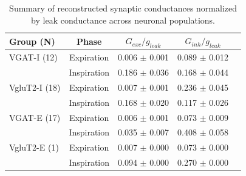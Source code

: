 \begin{table}[htbp]
\centering
\caption{Summary of reconstructed synaptic conductances normalized by leak conductance across neuronal populations.}
\label{tab:conductance_summary}
\begin{tabular}{lcccc}
\hline
Group (N) & Phase & $G_{exc}/g_{leak}$ & $G_{inh}/g_{leak}$ \\
\hline
VGAT-I (12) & Expiration & 0.006 $\pm$ 0.001 & 0.089 $\pm$ 0.012 \\
& Inspiration & 0.186 $\pm$ 0.036 & 0.168 $\pm$ 0.044 \\
\hline
VgluT2-I (18) & Expiration & 0.007 $\pm$ 0.001 & 0.236 $\pm$ 0.045 \\
& Inspiration & 0.168 $\pm$ 0.020 & 0.117 $\pm$ 0.026 \\
\hline
VGAT-E (17) & Expiration & 0.006 $\pm$ 0.001 & 0.073 $\pm$ 0.009 \\
& Inspiration & 0.035 $\pm$ 0.007 & 0.408 $\pm$ 0.058 \\
\hline
VgluT2-E (1) & Expiration & 0.007 $\pm$ 0.000 & 0.073 $\pm$ 0.000 \\
& Inspiration & 0.094 $\pm$ 0.000 & 0.270 $\pm$ 0.000 \\
\hline
\end{tabular}
\end{table}
